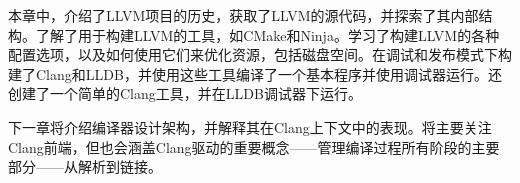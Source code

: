 本章中，介绍了LLVM项目的历史，获取了LLVM的源代码，并探索了其内部结构。了解了用于构建LLVM的工具，如CMake和Ninja。学习了构建LLVM的各种配置选项，以及如何使用它们来优化资源，包括磁盘空间。在调试和发布模式下构建了Clang和LLDB，并使用这些工具编译了一个基本程序并使用调试器运行。还创建了一个简单的Clang工具，并在LLDB调试器下运行。

下一章将介绍编译器设计架构，并解释其在Clang上下文中的表现。将主要关注Clang前端，但也会涵盖Clang驱动的重要概念——管理编译过程所有阶段的主要部分——从解析到链接。